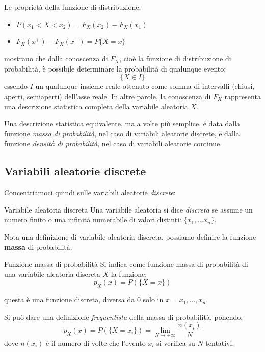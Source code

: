 \documentclass[a4paper,11pt]{article}
\begin{document}
Le proprietà della funzione di distribuzione:
\begin{itemize}
	\item $P(x_1 < X < x_2) = F_X (x_2) - F_X( x_1)$
	\item $F_X(x^{+}) - F_X(x^{-}) = P\{ X = x \}$
\end{itemize}
mostrano che dalla conoscenza di $F_X$, cioè la funzione di distribuzione di probabilità, è possibile determinare la probabilità di qualunque evento: 
$$
\{ X \in I \}
$$ 
essendo $I$ un qualunque insieme reale ottenuto come somma di intervalli (chiusi, aperti, semiaperti) dell’asse reale. In altre parole, la conoscenza di $F_X$ rappresenta una descrizione statistica completa della variabile aleatoria $X$.

Una descrizione statistica equivalente, ma a volte più semplice, è data dalla funzione \textit{massa di probabilità}, nel caso di variabili aleatorie discrete, e dalla funzione \textit{densità di probabilità}, nel caso di variabili aleatorie continue.

\subsection{Variabili aleatorie discrete}
Concentriamoci quindi sulle variabili aleatorie \textit{discrete}:
\begin{definition}{Variabile aleatoria discreta}
	Una variabile aleatoria si dice \textit{discreta} se assume un numero finito o una infinità numerabile di valori distinti: $\{x_1, ... x_n\}$.
\end{definition}

Nota una definizione di variabile aleatoria discreta, possiamo definire la funzione \textbf{massa} di probabilità:
\begin{definition}{Funzione massa di probabilità}
Si indica come funzione massa di probabilità di una variabile aleatoria discreta $X$ la funzione:
$$
p_X(x) = P(\{ X = x \})
$$
\end{definition}
questa è una funzione discreta, diversa da $0$ solo in $x = x_1, ..., x_n$.

Si può dare una definizione \textit{frequentista} della massa di probabilità, ponendo:
$$
p_X(x) = P(\{ X = x_i \}) = \lim_{N \rightarrow + \infty} \frac{n(x_i)}{N}
$$
dove $n(x_i)$ è il numero di volte che l'evento $x_i$ si verifica su $N$ tentativi.
\end{document}
